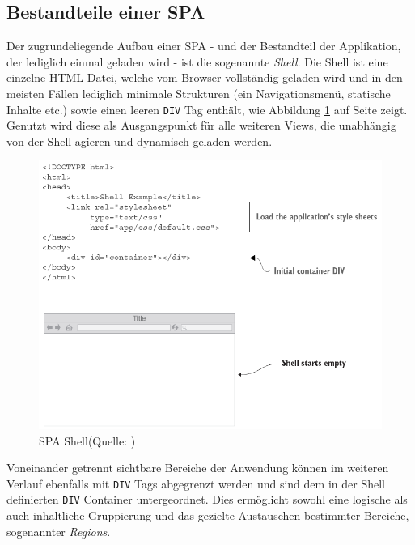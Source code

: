 \documentclass[a4paper,12pt,twoside]{scrreprt}
\begin{document}
\subsection{Bestandteile einer \acs{SPA}}
\label{subsec:spa-bestandteile}
Der zugrundeliegende Aufbau einer \ac{SPA} - und der Bestandteil der Applikation, der lediglich einmal geladen wird - ist die sogenannte \textit{Shell}. Die Shell ist eine einzelne HTML-Datei, welche vom Browser vollständig geladen wird und in den meisten Fällen lediglich minimale Strukturen (ein Navigationsmenü, statische Inhalte etc.) sowie einen leeren \texttt{DIV} Tag enthält, wie Abbildung \ref{fig:spa-shell} auf Seite \pageref{fig:spa-overview} zeigt. Genutzt wird diese als Ausgangspunkt für alle weiteren Views, die unabhängig von der Shell agieren und dynamisch geladen werden. \parencite[][Seite 8]{scott_spa_2015}

\begin{figure}[ht]
    \centering
    \includegraphics[scale=0.45]{images/Scott_SPA-shell.png}
    \caption[\acs{SPA} Shell]{\acs{SPA} Shell\newline(Quelle: \cite[][Seite 8]{scott_spa_2015})}
    \label{fig:spa-shell}
\end{figure}

Voneinander getrennt sichtbare Bereiche der Anwendung können im weiteren Verlauf ebenfalls mit \texttt{DIV} Tags abgegrenzt werden und sind dem in der Shell definierten \texttt{DIV} Container untergeordnet. Dies ermöglicht sowohl eine logische als auch inhaltliche Gruppierung und das gezielte Austauschen bestimmter Bereiche, sogenannter \textit{Regions}. \parencite[][Seite 9]{scott_spa_2015}
\end{document}
